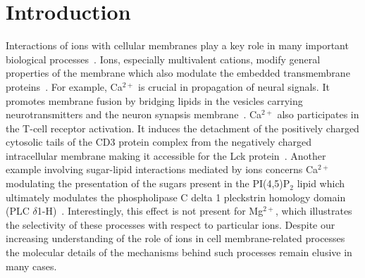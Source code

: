 \documentclass[journal=jpcbfk,manuscript=article]{achemso}
\begin{document}



\section{Introduction}
Interactions of ions with cellular membranes play a key role in many important biological processes~\cite{seelig90,cevc90}. Ions, especially multivalent cations, modify general properties of the membrane which also modulate the embedded transmembrane proteins~\cite{cevc90,tocanne90, pabst07}. For example, Ca$^{2+}$  is crucial in propagation of neural signals. It promotes membrane fusion by bridging lipids in the vesicles carrying neurotransmitters and the neuron synapsis membrane~\cite{papahadjopoulos90,brouwer15}. Ca$^{2+}$ also participates in the T-cell receptor activation. It induces the detachment of the positively charged cytosolic tails of the CD3 protein complex from the negatively charged intracellular membrane making it accessible for the Lck protein~\cite{Shi2013Ca2}. Another example involving sugar-lipid interactions mediated by ions concerns Ca$^{2+}$ modulating the presentation of the sugars present in the PI(4,5)P$_2$ lipid which ultimately modulates the phospholipase C delta 1 pleckstrin homology domain (PLC $\delta$1-H)~\cite{Bilkova2017Calcium}. Interestingly, this effect is not present for Mg$^{2+}$, which illustrates the selectivity of these processes with respect to particular ions. Despite our increasing understanding of the role of ions in cell membrane-related processes the molecular details of the mechanisms behind such processes remain elusive in many cases. 
\end{document}
